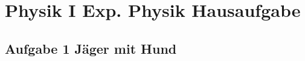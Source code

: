 \documentclass[a4paper,12pt]{article}
\begin{document}
\section*{Physik I \hfill Exp. Physik Hausaufgabe}

\subsection*{Aufgabe 1 \hfill Jäger mit Hund}
\end{document}
